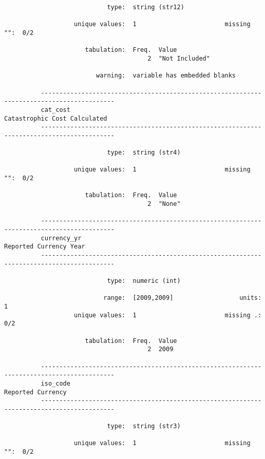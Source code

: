 \documentclass{article}
\begin{document}
\begin{verbatim}
                            type:  string (str12)
          
                   unique values:  1                        missing "":  0/2
          
                      tabulation:  Freq.  Value
                                       2  "Not Included"
          
                         warning:  variable has embedded blanks
          
          ------------------------------------------------------------------------------------------
          cat_cost                                                      Catastrophic Cost Calculated
          ------------------------------------------------------------------------------------------
          
                            type:  string (str4)
          
                   unique values:  1                        missing "":  0/2
          
                      tabulation:  Freq.  Value
                                       2  "None"
          
          ------------------------------------------------------------------------------------------
          currency_yr                                                         Reported Currency Year
          ------------------------------------------------------------------------------------------
          
                            type:  numeric (int)
          
                           range:  [2009,2009]                  units:  1
                   unique values:  1                        missing .:  0/2
          
                      tabulation:  Freq.  Value
                                       2  2009
          
          ------------------------------------------------------------------------------------------
          iso_code                                                                 Reported Currency
          ------------------------------------------------------------------------------------------
          
                            type:  string (str3)
          
                   unique values:  1                        missing "":  0/2
          

\end{verbatim}
\end{document}
